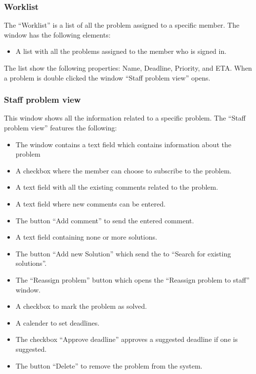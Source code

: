 

\subsubsection{Worklist}
The ``Worklist'' is a list of all the problem assigned to a specific \astaff member. The window has the following elements:
\begin{itemize}
	\item A list with all the problems assigned to the \astaff member who is signed in.
\end{itemize}
The list show the following properties: Name, Deadline, Priority, and ETA.
When a problem is double clicked the window ``Staff problem view'' opens. 


\subsubsection{Staff problem view}
This window shows all the information related to a specific problem. 
The ``Staff problem view'' features the following:
\begin{itemize}
	\item The window contains a text field which contains information about the problem
	\item A checkbox where the \astaff member can choose to subscribe to the problem.
	\item A text field with all the existing comments related to the problem.
	\item A text field where new comments can be entered.
	\item The button ``Add comment'' to send the entered comment.
	\item A text field containing none or more solutions.
	\item The button ``Add new Solution'' which send the \astaff[] to ``Search for existing solutions''.  
	\item The ``Reassign problem'' button which opens the ``Reassign problem to staff'' window.
	\item A checkbox to mark the problem as solved.
	\item A calender to set deadlines.
	\item The checkbox ``Approve deadline'' approves a suggested deadline if one is suggested.
	\item The button ``Delete'' to remove the problem from the system. 
\end{itemize}

